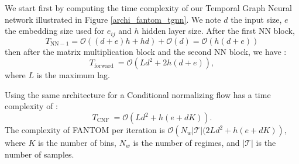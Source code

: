 We start first by computing the time complexity of our Temporal Graph Neural network illustrated in Figure \ref{archi_fantom_tgnn}. We note $d$ the input size, $e$ the embedding size used for $e_{ij}$ and $h$ hidden layer size. After the first NN block, $$
T_{\mathrm{NN}-1}=\mathcal{O}((d+e) h+h d)+\mathcal{O}(d)=\mathcal{O}(h(d+e))
$$
then after the matrix multiplication block and the second NN block, we have :
$$
T_{\text {forward }}=\mathcal{O}\left(L d^2+2 h(d+e)\right),
$$
where $L$ is the maximum lag.

Using the same architecture for a Conditional normalizing flow has a time complexity of :
$$
T_{\text {CNF }}=\mathcal{O}\left(L d^2+h\left(e+d K\right)\right).
$$
The complexity of FANTOM per iteration is $\mathcal{O}\left(N_w|\mathcal{T}|(2L d^2+h\left(e+d K\right)\right),$ where $K$ is the number of bins, $N_w$ is the number of regimes, and $|\mathcal{T}|$ is the number of samples.